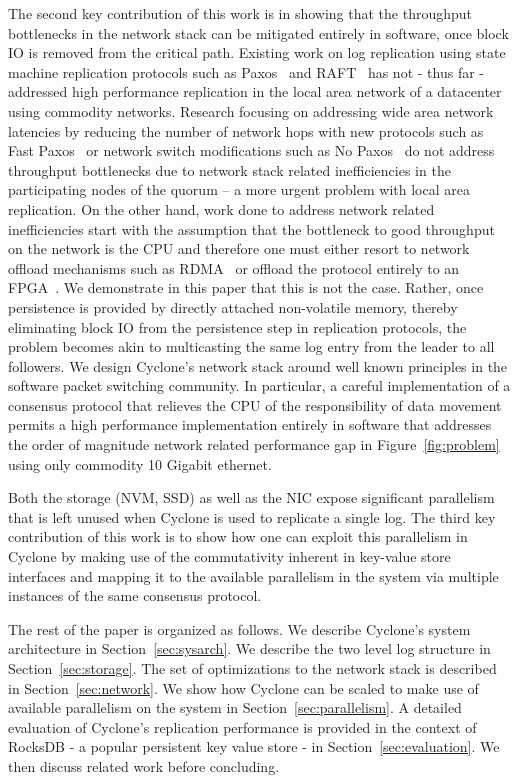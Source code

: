\documentclass[pageno]{jpaper}
\begin{document}
The second key contribution of this work is in showing that the throughput
bottlenecks in the network stack can be mitigated entirely in software, once
block IO is removed from the critical path. Existing work on log replication
using state machine replication protocols such as Paxos~\cite{paxos} and
RAFT~\cite{raft} has not - thus far - addressed high performance replication in
the local area network of a datacenter using commodity networks.  Research
focusing on addressing wide area network latencies by reducing the number of
network hops with new protocols such as Fast Paxos~\cite{fast-paxos} or network
switch modifications such as No Paxos~\cite{nopaxos} do not address throughput
bottlenecks due to network stack related inefficiencies in the participating
nodes of the quorum -- a more urgent problem with local area replication. On the
other hand, work done to address network related inefficiencies start with the
assumption that the bottleneck to good throughput on the network is the CPU and
therefore one must either resort to network offload mechanisms such as RDMA~\cite{dare,
  farm, faast} or offload the protocol entirely to an
FPGA~\cite{consensus_box}. We demonstrate in this paper that this is not the
case. Rather, once persistence is provided by directly attached non-volatile
memory, thereby eliminating block IO from the persistence step in replication
protocols, the problem becomes akin to multicasting the same log entry
from the leader to all followers. We design Cyclone's network stack around well
known principles in the software packet switching community. In particular, a
careful implementation of a consensus protocol that relieves the CPU of the
responsibility of data movement permits a high performance implementation
entirely in software that addresses the order of magnitude network related
performance gap in Figure~\ref{fig:problem} using only commodity 10 Gigabit
ethernet.

Both the storage (NVM, SSD) as well as the NIC expose significant parallelism
that is left unused when Cyclone is used to replicate a single log. The third
key contribution of this work is to show how one can exploit this parallelism in
Cyclone by making use of the commutativity inherent in key-value store
interfaces and mapping it to the available parallelism in the system via
multiple instances of the same consensus protocol.

The rest of the paper is organized as follows. We describe Cyclone's system
architecture in Section~\ref{sec:sysarch}. We describe the two level log
structure in Section~\ref{sec:storage}. The set of optimizations to the network
stack is described in Section~\ref{sec:network}. We show how Cyclone can be
scaled to make use of available parallelism on the system in
Section~\ref{sec:parallelism}. A detailed evaluation of Cyclone's replication
performance is provided in the context of RocksDB - a popular persistent key
value store - in Section~\ref{sec:evaluation}. We then discuss related work
before concluding.
\end{document}
